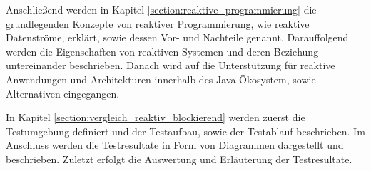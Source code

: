 Anschließend werden in Kapitel \ref{section:reaktive_programmierung} die grundlegenden Konzepte von reaktiver Programmierung,
wie reaktive Datenströme, erklärt, sowie dessen Vor- und Nachteile genannt. Darauffolgend werden die Eigenschaften von reaktiven
Systemen und deren Beziehung untereinander beschrieben.
Danach wird auf die Unterstützung für reaktive Anwendungen und Architekturen innerhalb des Java Ökosystem, sowie Alternativen
eingegangen.

In Kapitel \ref{section:vergleich_reaktiv_blockierend} werden zuerst die Testumgebung definiert und der Testaufbau,
sowie der Testablauf beschrieben.
Im Anschluss werden die Testresultate in Form von Diagrammen dargestellt und beschrieben.
Zuletzt erfolgt die Auswertung und Erläuterung der Testresultate.